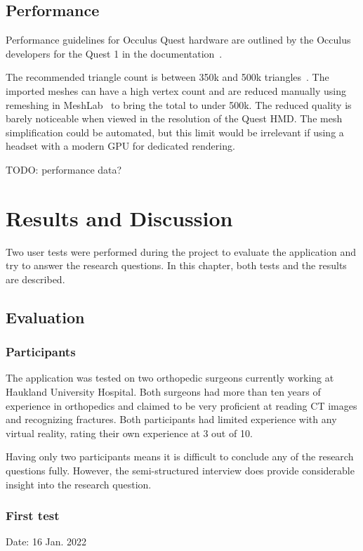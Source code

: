 \documentclass[a4paper]{report}
\begin{document}
\section{Performance}
Performance guidelines for Occulus Quest hardware are outlined by the Occulus developers for the Quest 1 in the documentation~\cite{noauthor_oculus_nodate}.

The recommended triangle count is between 350k and 500k triangles~\cite{noauthor_performance_nodate}. The imported meshes can have a high vertex count and are reduced manually using remeshing in MeshLab~\cite{cignoni_meshlab_2008} to bring the total to under 500k. The reduced quality is barely noticeable when viewed in the resolution of the Quest HMD.
The mesh simplification could be automated, but this limit would be irrelevant if using a headset with a modern GPU for dedicated rendering.

TODO: performance data?


\chapter{Results and Discussion}

Two user tests were performed during the project to evaluate the application and try to answer the research questions. In this chapter, both tests and the results are described.

\section{Evaluation}

\subsection{Participants}

The application was tested on two orthopedic surgeons currently working at Haukland University Hospital.
Both surgeons had more than ten years of experience in orthopedics and claimed to be very proficient at reading CT images and recognizing fractures.
Both participants had limited experience with any virtual reality, rating their own experience at 3 out of 10.

Having only two participants means it is difficult to conclude any of the research questions fully. However, the semi-structured interview does provide considerable insight into the research question.

\subsection{First test}
Date: 16 Jan. 2022
\end{document}
